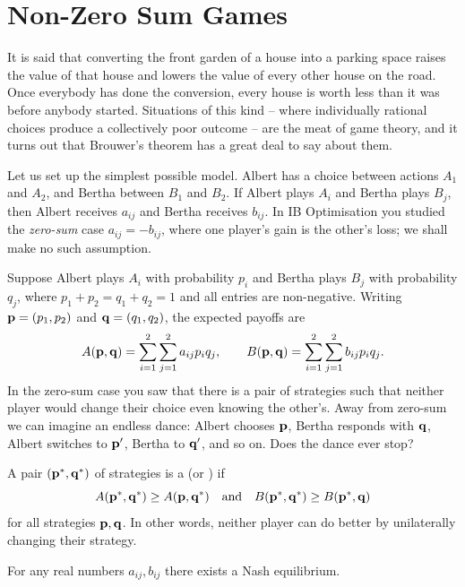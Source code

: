 \documentclass[a4paper]{scrartcl}
\begin{document}
\section{Non-Zero Sum Games}

It is said that converting the front garden of a house into a parking space raises the value of that house and lowers the value of every other house on the road. Once everybody has done the conversion, every house is worth less than it was before anybody started. Situations of this kind -- where individually rational choices produce a collectively poor outcome -- are the meat of game theory, and it turns out that Brouwer's theorem has a great deal to say about them.

Let us set up the simplest possible model. Albert has a choice between actions $A_1$ and $A_2$, and Bertha between $B_1$ and $B_2$. If Albert plays $A_i$ and Bertha plays $B_j$, then Albert receives $a_{ij}$ and Bertha receives $b_{ij}$. In IB Optimisation you studied the \emph{zero-sum} case $a_{ij} = -b_{ij}$, where one player's gain is the other's loss; we shall make no such assumption.

Suppose Albert plays $A_i$ with probability $p_i$ and Bertha plays $B_j$ with probability $q_j$, where $p_1+p_2 = q_1+q_2 = 1$ and all entries are non-negative. Writing $\mathbf{p} = (p_1,p_2)$ and $\mathbf{q} = (q_1,q_2)$, the expected payoffs are
$$A(\mathbf{p},\mathbf{q}) = \sum_{i=1}^2\sum_{j=1}^2 a_{ij}p_iq_j, \qquad B(\mathbf{p},\mathbf{q}) = \sum_{i=1}^2\sum_{j=1}^2 b_{ij}p_iq_j.$$
In the zero-sum case you saw that there is a pair of strategies such that neither player would change their choice even knowing the other's. Away from zero-sum we can imagine an endless dance: Albert chooses $\mathbf{p}$, Bertha responds with $\mathbf{q}$, Albert switches to $\mathbf{p}'$, Bertha to $\mathbf{q}'$, and so on. Does the dance ever stop?

\begin{definition}
	A pair $(\mathbf{p}^*,\mathbf{q}^*)$ of strategies is a  (or ) if
	$$A(\mathbf{p}^*,\mathbf{q}^*) \geq A(\mathbf{p},\mathbf{q}^*) \quad\text{and}\quad B(\mathbf{p}^*,\mathbf{q}^*)\geq B(\mathbf{p}^*,\mathbf{q})$$
	for all strategies $\mathbf{p},\mathbf{q}$. In other words, neither player can do better by unilaterally changing their strategy.
\end{definition}

\begin{theorem}[Nash]\label{thm:nash}
	For any real numbers $a_{ij}, b_{ij}$ there exists a Nash equilibrium.
\end{theorem}
\end{document}
